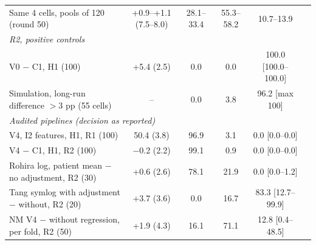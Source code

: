\begin{table}[t]
\begin{tabular}{p{}ccccc}
Same 4 cells, pools of 120 (round 50) & +0.9--+1.1 (7.5--8.0) & 28.1--33.4 & 55.3--58.2 & 10.7--13.9 \\
\multicolumn{5}{l}{\textit{R2, positive controls}} \\
V0 $-$ C1, H1 (100) & +5.4 (2.5) & 0.0 & 0.0 & 100.0 [100.0--100.0] \\
Simulation, long-run difference $>3$ pp (55 cells) & -- & 0.0 & 3.8 & 96.2 [max 100] \\
\multicolumn{5}{l}{\textit{Audited pipelines (decision as reported)}} \\
V4, I2 features, H1, R1 (100) & 50.4 (3.8) & 96.9 & 3.1 & 0.0 [0.0--0.0] \\
V4 $-$ C1, H1, R2 (100) & $-$0.2 (2.2) & 99.1 & 0.9 & 0.0 [0.0--0.0] \\
Rohira log, patient mean $-$ no adjustment, R2 (30) & +0.6 (2.6) & 78.1 & 21.9 & 0.0 [0.0--1.2] \\
Tang symlog with adjustment $-$ without, R2 (20) & +3.7 (3.6) & 0.0 & 16.7 & 83.3 [12.7--99.9] \\
NM V4 $-$ without regression, per fold, R2 (50) & +1.9 (4.3) & 16.1 & 71.1 & 12.8 [0.4--48.5] \\
\bottomrule
\end{tabular}
\end{table}
